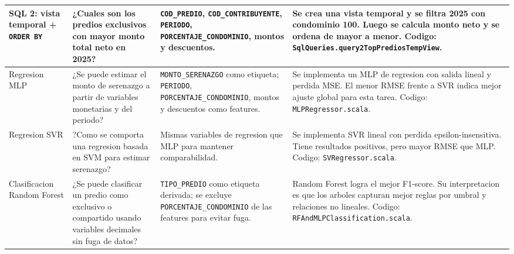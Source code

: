 \begin{longtable}{
  p{}
  p{}
  p{}
  p{}
}
\midrule

SQL 2: vista temporal + \texttt{ORDER BY} &

¿Cuales son los predios exclusivos con mayor monto total neto en 2025? &

\texttt{COD\_PREDIO}, \texttt{COD\_CONTRIBUYENTE}, \texttt{PERIODO}, \texttt{PORCENTAJE\_CONDOMINIO}, montos y descuentos. &

Se crea una vista temporal y se filtra 2025 con condominio 100. Luego se calcula monto neto y se ordena de mayor a menor. Codigo: \texttt{SqlQueries.query2TopPrediosTempView}. \\

\midrule

Regresion MLP &

¿Se puede estimar el monto de serenazgo a partir de variables monetarias y del periodo? &

\texttt{MONTO\_SERENAZGO} como etiqueta; \texttt{PERIODO}, \texttt{PORCENTAJE\_CONDOMINIO}, montos y descuentos como features. &

Se implementa un MLP de regresion con salida lineal y perdida MSE. El menor RMSE frente a SVR indica mejor ajuste global para esta tarea. Codigo: \texttt{MLPRegressor.scala}. \\

\midrule

Regresion SVR &

?Como se comporta una regresion basada en SVM para estimar serenazgo? &

Mismas variables de regresion que MLP para mantener comparabilidad. &

Se implementa SVR lineal con perdida epsilon-insensitiva. Tiene resultados positivos, pero mayor RMSE que MLP. Codigo: \texttt{SVRegressor.scala}. \\

\midrule

Clasificacion Random Forest &

¿Se puede clasificar un predio como exclusivo o compartido usando variables decimales sin fuga de datos? &

\texttt{TIPO\_PREDIO} como etiqueta derivada; se excluye \texttt{PORCENTAJE\_CONDOMINIO} de las features para evitar fuga. &

Random Forest logra el mejor F1-score. Su interpretacion es que los arboles capturan mejor reglas por umbral y relaciones no lineales. Codigo: \texttt{RFAndMLPClassification.scala}. \\


\end{longtable}
